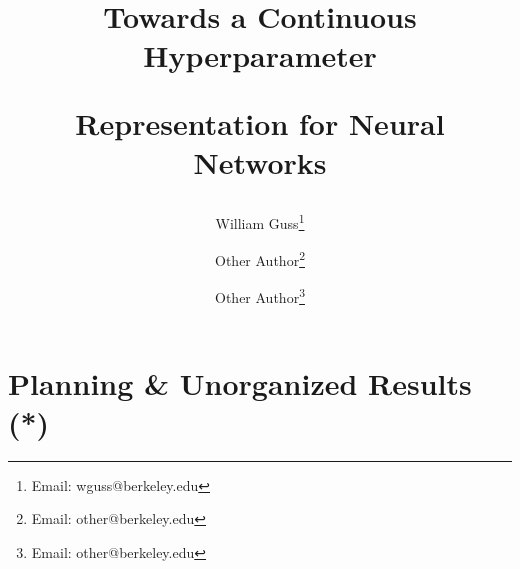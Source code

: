 \documentclass[12pt]{article}
\title{
 \begin{minipage}[c]{1.05\textwidth}
 	\centerline{Towards a Continuous Hyperparameter}
 	\centerline{Representation for Neural Networks}
 \end{minipage}
}
\author{
	\vspace{1cm}
	William Guss\thanks{Email: wguss@berkeley.edu} \and
	Other Author\thanks{Email: other@berkeley.edu} \and 
	Other Author\thanks{Email: other@berkeley.edu}
}
\newif\ifdraft
\begin{document}
\maketitle
\thispagestyle{empty}

\begin{abstract}
% 
\end{abstract}

\ifdraft
\newpage

\fi

\newpage
\thispagestyle{empty}

{\large
{}
\vspace*{\fill}
\tableofcontents
\vspace*{\fill}
}

\newpage

\setcounter{page}{1}


\section{Planning \& Unorganized Results (*)}
\end{document}
